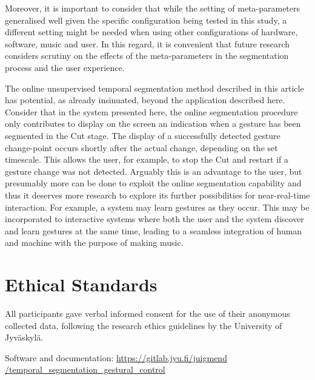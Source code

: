 \documentclass{nime-alternate_MANUSCRIPT} %
\begin{document}
Moreover, it is important to consider that while the setting of meta-parameters generalised well given the specific configuration being tested in this study, a different setting might be needed when using other configurations of hardware, software, music and user. In this regard, it is convenient that future research considers scrutiny on the effects of the meta-parameters in the segmentation process and the user experience.

The online unsupervised temporal segmentation method described in this article has potential, as already insinuated, beyond the application described here. Consider that in the system presented here, the online segmentation procedure only contributes to display on the screen an indication when a gesture has been segmented in the Cut stage.  The display of a successfully detected gesture change-point occurs shortly after the actual change, depending on the set timescale. This allows the user, for example, to stop the Cut and restart if a gesture change was not detected. Arguably this is an advantage to the user, but presumably more can be done to exploit the online segmentation capability and thus it deserves more research to explore its further possibilities for near-real-time interaction. For example, a system may learn gestures as they occur. This may be incorporated to interactive systems where both the user and the system discover and learn gestures at the same time, leading to a seamless integration of human and machine with the purpose of making music.


\section{Ethical Standards}
All participants gave verbal informed consent for the use of their anonymous collected data, following the research ethics guidelines by the 
University of Jyväskylä.

%


	 

%
%
\appendix
Software and documentation: 
\href{https://gitlab.jyu.fi/juigmend/temporal_segmentation_gestural_control}{https://gitlab.jyu.fi/juigmend\\/temporal\_segmentation\_gestural\_control}
\end{document}
